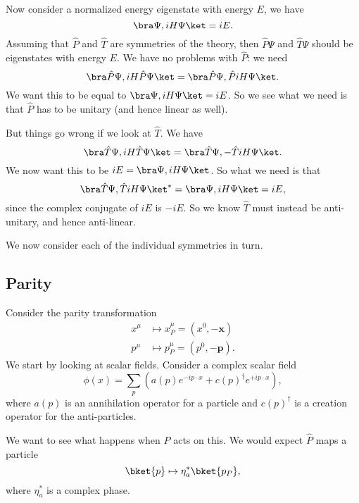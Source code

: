 \documentclass[a4paper]{article}
\begin{document}
Now consider a normalized energy eigenstate with energy $E$, we have
\[
  \bra \Psi, i H \Psi\ket = iE.
\]
Assuming that $\hat{P}$ and $\hat{T}$ are symmetries of the theory, then $\hat{P} \Psi$ and $\hat{T} \Psi$ should be eigenstates with energy $E$. We have no problems with $\hat{P}$: we need
\[
  \bra \hat{P} \Psi, iH \hat{P} \Psi\ket = \bra \hat{P} \Psi, \hat{P} iH \Psi \ket.
\]
We want this to be equal to $\bra \Psi, iH \Psi\ket = iE$. So we see what we need is that $\hat{P}$ has to be unitary (and hence linear as well).

But things go wrong if we look at $\hat{T}$. We have
\[
  \bra \hat{T} \Psi, iH \hat{T} \Psi\ket = \bra \hat{T} \Psi, -\hat{T} iH \Psi \ket.
\]
We now want this to be $iE = \bra \Psi, iH \Psi\ket$. So what we need is that
\[
  \bra \hat{T} \Psi, \hat{T} iH \Psi \ket^* = \bra \Psi, iH \Psi\ket = iE,
\]
since the complex conjugate of $iE$ is $-iE$. So we know $\hat{T}$ must instead be anti-unitary, and hence anti-linear.

We now consider each of the individual symmetries in turn.
\subsection{Parity}
Consider the parity transformation
\begin{align*}
  x^\mu &\mapsto x^\mu_P = (x^0, -\mathbf{x})\\
  p^\mu &\mapsto p^\mu_P = (p^0, -\mathbf{p}).
\end{align*}
We start by looking at scalar fields. Consider a complex scalar field
\[
  \phi(x) = \sum_p \left(a(p) e^{-ip\cdot x} + c(p)^\dagger e^{+i p\cdot x}\right),
\]
where $a(p)$ is an annihilation operator for a particle and $c(p)^\dagger$ is a creation operator for the anti-particles.

We want to see what happens when $P$ acts on this. We would expect $\hat{P}$ maps a particle
\[
  \bket{p} \mapsto \eta^*_a\bket{p_P},
\]
where $\eta^*_a$ is a complex phase.
\end{document}
